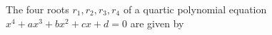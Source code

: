 The four roots $r_1, r_2, r_3, r_4$ of a quartic polynomial equation\n$x^4 + ax^3 + bx^2 + cx + d = 0$ are given by